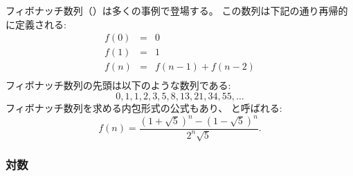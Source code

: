 
\begin{comment}
The \key{Fibonacci numbers}
arise in many situations.
They can be defined recursively as follows:
\[
\begin{array}{lcl}
f(0) & = & 0 \\
f(1) & = & 1 \\
f(n) & = & f(n-1)+f(n-2) \\
\end{array}
\]
The first Fibonacci numbers are
\[0, 1, 1, 2, 3, 5, 8, 13, 21, 34, 55, \ldots\]
There is also a closed-form formula
for calculating Fibonacci numbers, which is sometimes called
\index{Binet's formula} \key{Binet's formula}:
\[f(n)=\frac{(1 + \sqrt{5})^n - (1-\sqrt{5})^n}{2^n \sqrt{5}}.\]
\end{comment}

フィボナッチ数列（）は多くの事例で登場する。
この数列は下記の通り再帰的に定義される:
\[
\begin{array}{lcl}
f(0) & = & 0 \\
f(1) & = & 1 \\
f(n) & = & f(n-1)+f(n-2) \\
\end{array}
\]
フィボナッチ数列の先頭は以下のような数列である:
\[0, 1, 1, 2, 3, 5, 8, 13, 21, 34, 55, \ldots\]
フィボナッチ数列を求める内包形式の公式もあり、 と呼ばれる:
\[f(n)=\frac{(1 + \sqrt{5})^n - (1-\sqrt{5})^n}{2^n \sqrt{5}}.\]

\begin{comment}
\subsubsection{Logarithms}
\end{comment}
\subsubsection{対数}


\begin{comment}
The \key{logarithm} of a number $x$
is denoted $\log_k(x)$, where $k$ is the base
of the logarithm.
According to the definition,
$\log_k(x)=a$ exactly when $k^a=x$.

A useful property of logarithms is
that $\log_k(x)$ equals the number of times
we have to divide $x$ by $k$ before we reach 
the number 1.
For example, $\log_2(32)=5$
because 5 divisions by 2 are needed:
\end{comment}

